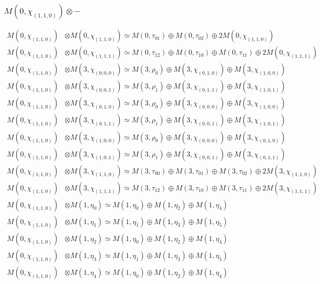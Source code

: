 \subsubsection{$ M(0,\chi_{(1,1,0)})\otimes -$}
\begin{align*}
M(0,\chi_{(1,1,0)}) &\otimes M(0,\chi_{(1,1,0)}) \simeq M(0,\tau_{01}) \oplus M(0,\tau_{02}) \oplus 2 M(0,\chi_{(1,1,0)}) \\
M(0,\chi_{(1,1,0)}) &\otimes M(0,\chi_{(1,1,1)}) \simeq M(0,\tau_{12}) \oplus M(0,\tau_{10}) \oplus M(0,\tau_{11}) \oplus 2 M(0,\chi_{(1,1,1)}) \\
M(0,\chi_{(1,1,0)}) &\otimes M(3,\chi_{(0,0,0)}) \simeq M(3,\rho_{0}) \oplus M(3,\chi_{(0,1,0)}) \oplus M(3,\chi_{(1,0,0)}) \\
M(0,\chi_{(1,1,0)}) &\otimes M(3,\chi_{(0,0,1)}) \simeq M(3,\rho_{1}) \oplus M(3,\chi_{(0,1,1)}) \oplus M(3,\chi_{(1,0,1)}) \\
M(0,\chi_{(1,1,0)}) &\otimes M(3,\chi_{(0,1,0)}) \simeq M(3,\rho_{0}) \oplus M(3,\chi_{(0,0,0)}) \oplus M(3,\chi_{(1,0,0)}) \\
M(0,\chi_{(1,1,0)}) &\otimes M(3,\chi_{(0,1,1)}) \simeq M(3,\rho_{1}) \oplus M(3,\chi_{(0,0,1)}) \oplus M(3,\chi_{(1,0,1)}) \\
M(0,\chi_{(1,1,0)}) &\otimes M(3,\chi_{(1,0,0)}) \simeq M(3,\rho_{0}) \oplus M(3,\chi_{(0,0,0)}) \oplus M(3,\chi_{(0,1,0)}) \\
M(0,\chi_{(1,1,0)}) &\otimes M(3,\chi_{(1,0,1)}) \simeq M(3,\rho_{1}) \oplus M(3,\chi_{(0,0,1)}) \oplus M(3,\chi_{(0,1,1)}) \\
M(0,\chi_{(1,1,0)}) &\otimes M(3,\chi_{(1,1,0)}) \simeq M(3,\tau_{00}) \oplus M(3,\tau_{01}) \oplus M(3,\tau_{02}) \oplus 2 M(3,\chi_{(1,1,0)}) \\
M(0,\chi_{(1,1,0)}) &\otimes M(3,\chi_{(1,1,1)}) \simeq M(3,\tau_{12}) \oplus M(3,\tau_{10}) \oplus M(3,\tau_{11}) \oplus 2 M(3,\chi_{(1,1,1)}) \\
M(0,\chi_{(1,1,0)}) &\otimes M(1,\eta_{0}) \simeq M(1,\eta_{0}) \oplus M(1,\eta_{2}) \oplus M(1,\eta_{4}) \\
M(0,\chi_{(1,1,0)}) &\otimes M(1,\eta_{1}) \simeq M(1,\eta_{1}) \oplus M(1,\eta_{3}) \oplus M(1,\eta_{5}) \\
M(0,\chi_{(1,1,0)}) &\otimes M(1,\eta_{2}) \simeq M(1,\eta_{0}) \oplus M(1,\eta_{2}) \oplus M(1,\eta_{4}) \\
M(0,\chi_{(1,1,0)}) &\otimes M(1,\eta_{3}) \simeq M(1,\eta_{1}) \oplus M(1,\eta_{3}) \oplus M(1,\eta_{5}) \\
M(0,\chi_{(1,1,0)}) &\otimes M(1,\eta_{4}) \simeq M(1,\eta_{0}) \oplus M(1,\eta_{2}) \oplus M(1,\eta_{4}) \\

\end{align*}
